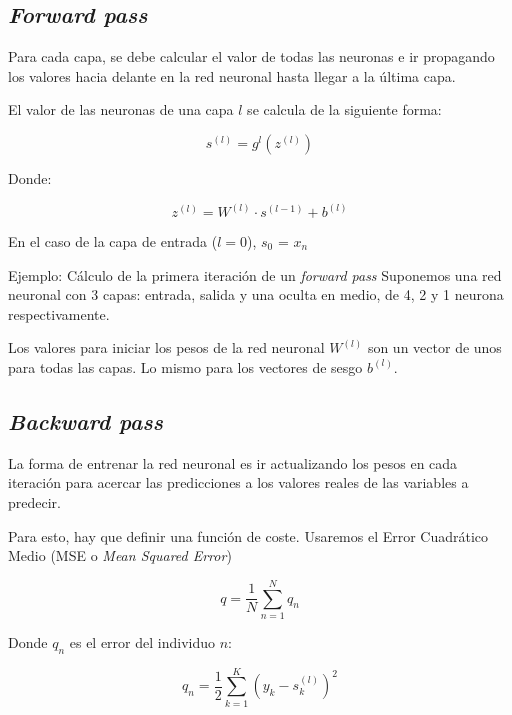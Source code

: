 \subsection{\textit{Forward pass}}

Para cada capa, se debe calcular el valor de todas las neuronas e ir propagando los valores hacia delante en la red neuronal hasta llegar a la última capa.


El valor de las neuronas de una capa $l$ se calcula de la siguiente forma:

\begin{equation*}
    s^{(l)} = g^l(z^{(l)})
\end{equation*}

Donde:

\begin{equation*}
    z^{(l)} = W^{(l)} \cdot s^{(l-1)} + b^{(l)}
\end{equation*}

En el caso de la capa de entrada ($l = 0$), $s_0$ = $x_n$

\begin{examplebox}{Ejemplo: Cálculo de la primera iteración de un \textit{forward pass}}
    Suponemos una red neuronal con 3 capas: entrada, salida y una oculta en medio, de 4, 2 y 1 neurona respectivamente.
    
    Los valores para iniciar los pesos de la red neuronal $W^{(l)}$ son un vector de unos para todas las capas. Lo mismo para los vectores de sesgo $b^{(l)}$.
\end{examplebox}

\subsection{\textit{Backward pass}}
La forma de entrenar la red neuronal es ir actualizando los pesos en cada iteración para acercar las predicciones a los valores reales de las variables a predecir.

Para esto, hay que definir una función de coste. Usaremos el Error Cuadrático Medio (MSE o \textit{Mean Squared Error})

\begin{equation*}
    q = \frac{1}{N} \sum_{n = 1}^{N} q_n
\end{equation*}

Donde $q_n$ es el error del individuo $n$:

\begin{equation*}
    q_n = \frac{1}{2} \sum_{k = 1}^{K} \left( y_k - s^{(l)}_k \right)^2
\end{equation*}

